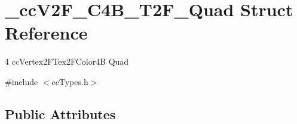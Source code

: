 \hypertarget{struct__cc_v2_f___c4_b___t2_f___quad}{\section{\-\_\-cc\-V2\-F\-\_\-\-C4\-B\-\_\-\-T2\-F\-\_\-\-Quad Struct Reference}
\label{struct__cc_v2_f___c4_b___t2_f___quad}
}


4 cc\-Vertex2\-F\-Tex2\-F\-Color4\-B Quad  




{\ttfamily \#include $<$cc\-Types.\-h$>$}

\subsection*{Public Attributes}
